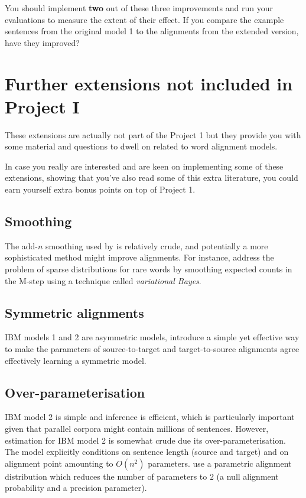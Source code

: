 You should implement {\bf two} out of these three improvements and run your evaluations
to measure the extent of their effect.
If you compare the example sentences from the original model 1 to the
alignments from the extended version, have they improved?
%
%
\section{Further extensions not included in Project I}
These extensions are actually not part of the Project 1 but they provide you with
some material and questions to dwell on related to word alignment models.

In case you really are interested and are keen on implementing some of these
extensions, showing that you've also read some of this extra literature, 
you could earn yourself extra bonus points on top of Project 1.
%
%
\subsection*{Smoothing}

The add-$n$ smoothing used by \cite{Moore:2004:IBM1} is relatively
crude, and potentially a more sophisticated method might improve
alignments.  For instance, \citet{Riley+2012:VBWA} address the problem
of sparse distributions for rare words by smoothing expected counts in
the M-step using a technique called \emph{variational Bayes}.


\subsection*{Symmetric alignments}

IBM models 1 and 2 are asymmetric models, \citep{Liang+2006:ABA} introduce a simple yet effective way to make the parameters of source-to-target and target-to-source alignments agree effectively learning a symmetric model.

\subsection*{Over-parameterisation}
IBM model 2 is simple and inference is efficient, which is particularly important given that parallel corpora might contain millions of sentences. 
However, estimation for IBM model 2 is somewhat crude due its over-parameterisation. 
The model explicitly conditions on sentence length (source and target) and on alignment point amounting to $O(n^2)$ parameters.
\cite{Dyer+2013:IBM2} use a parametric alignment distribution which reduces the number of parameters to $2$ (a null alignment probability and a precision parameter).

